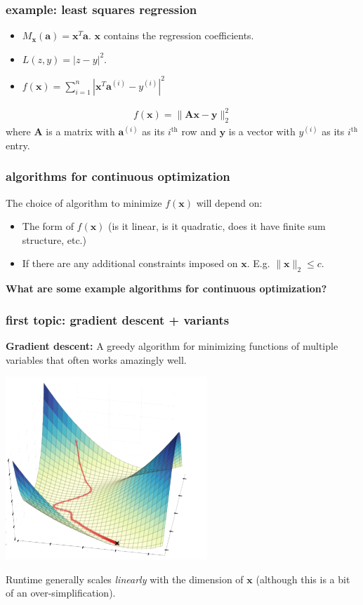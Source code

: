 \documentclass[compress]{beamer}
\newcommand{\bv}[1]{\mathbf{#1}}
\begin{document}
\begin{frame}
	\frametitle{example: least squares regression}
	\begin{itemize}
		\item $M_{\bv{x}}(\bv{a}) = \bv{x}^T\bv{a}$. $\bv{x}$ contains the regression coefficients. 
		\item $L(z,y) = |z-y|^2$. 
		\item $f(\bv{x}) = \sum_{i=1}^n |\bv{x}^T\bv{a}^{(i)} - y^{(i)}|^2$
	\end{itemize}
	\begin{align*}
		f(\bv{x}) = \|\bv{A}\bv{x} - \bv{y}\|_2^2
	\end{align*}
	where $\bv{A}$ is a matrix with $\bv{a}^{(i)}$ as its $i^\text{th}$ row and $\bv{y}$ is a vector with $y^{(i)}$ as its $i^\text{th}$ entry. 
\end{frame}

\begin{frame}
	\frametitle{algorithms for continuous optimization}
	The choice of algorithm to minimize $f(\bv{x})$ will depend on:
	\begin{itemize}
		\item The form of $f(\bv{x})$ (is it linear, is it quadratic, does it have finite sum structure, etc.)
		\item If there are any additional constraints imposed on $\bv{x}$. E.g. $\|\bv{x}\|_2 \leq c$. 
	\end{itemize}
	\textbf{What are some example algorithms for continuous optimization?}
	
\end{frame}

\begin{frame}
	\frametitle{first topic: gradient descent + variants}
	\textbf{Gradient descent:} A greedy algorithm for minimizing functions of multiple variables that often works amazingly well. 
	\begin{center}
		\includegraphics[width=.4\textwidth]{greedy_gradient.png}
		
		Runtime generally scales \emph{linearly} with the dimension of $\bv{x}$ (although this is a bit of an over-simplification).
	\end{center}
\end{frame}
\end{document}
